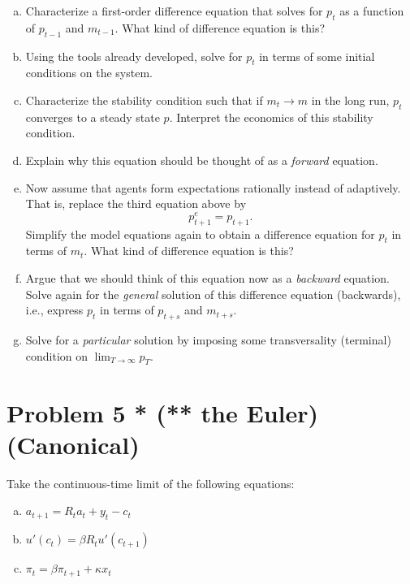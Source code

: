 \documentclass[11pt]{extarticle}
\theoremstyle{plain}
\theoremstyle{definition}
\begin{document}
\begin{enumerate}[(a)]
\item Characterize a first-order difference equation that solves for $p_t$ as a function of $p_{t-1}$ and $m_{t-1}$. What kind of difference equation is this? 

\item Using the tools already developed, solve for $p_t$ in terms of some initial conditions on the system.

\item Characterize the stability condition such that if $m_t \to m$ in the long run, $p_t$ converges to a steady state $p$. Interpret the economics of this stability condition. 

\item Explain why this equation should be thought of as a \textit{forward} equation.

\item Now assume that agents form expectations rationally instead of adaptively. That is, replace the third equation above by 
\begin{equation*}
	p_{t+1}^e = p_{t+1}.
\end{equation*}
Simplify the model equations again to obtain a difference equation for $p_t$ in terms of $m_t$. What kind of difference equation is this?

\item Argue that we should think of this equation now as a \textit{backward} equation. Solve again for the \textit{general} solution of this difference equation (backwards), i.e., express $p_t$ in terms of $p_{t+s}$ and $m_{t+s}$. 

\item Solve for a \textit{particular} solution by imposing some transversality (terminal) condition on $\lim_{T \to \infty} p_T$. 
\end{enumerate}


\vspace{10mm}
\section*{Problem 5 * (** the Euler) (Canonical)}

Take the continuous-time limit of the following equations:
\begin{enumerate}[(a)]
\item $a_{t+1} = R_t a_t + y_t - c_t$

\item $u'(c_t) = \beta R_t u'(c_{t+1})$

\item $\pi_t = \beta \pi_{t+1} + \kappa x_t$
\end{enumerate}
\end{document}
